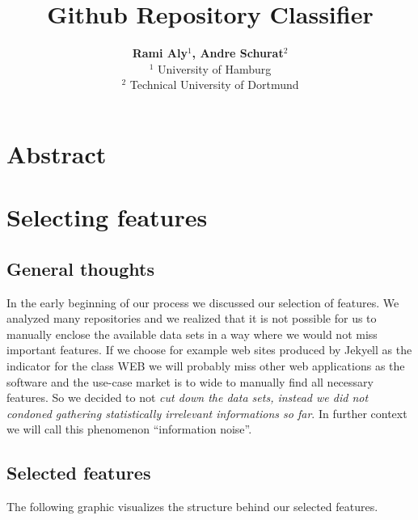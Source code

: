 \documentclass[paper=A4,pagesize=auto,12pt,headinclude=true,footinclude=true,BCOR=0mm,DIV=calc]{scrartcl}
\begin{document}
	
	\title{Github Repository Classifier}
	\author{\textbf{Rami Aly$^{1}$, Andre Schurat}$^{2}$\\
		$^{1}$ University of Hamburg\\
		$^{2}$ Technical University of Dortmund}
	\maketitle
	
	\newpage
	
	\section{Abstract}
	
	
	\newpage
	
	\tableofcontents 
	
	\newpage
	\section{Selecting features} 
	\subsection{General thoughts}
	In the early beginning of our process we discussed our selection of features. We analyzed many repositories and we realized that it is not possible for us to manually enclose the available data sets in a way where we would not miss important features. If we choose for example web sites produced by Jekyell as the indicator for the class WEB we will probably miss other web applications as the software and the use-case market is to wide to manually find all necessary features. So we decided to not \textit{cut down the data sets, instead we did not condoned gathering statistically irrelevant informations so far}. In further context we will call this phenomenon “information noise”.
	\subsection{Selected features}
	The following graphic visualizes the structure behind our selected features.
	
\end{document}
